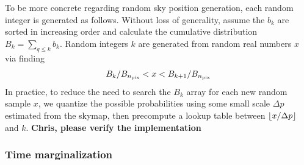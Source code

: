 To be more concrete regarding random sky position generation, each random integer is generated as follows. 
%
Without loss of generality, assume the $b_k$ are sorted in increasing order and calculate the cumulative distribution $B_k
= \sum_{q\le k} b_k$.   Random integers $k$ are generated from random real numbers $x$ via finding
\begin{eqnarray}
 B_k/B_{n_{\rm pix}} < x <  B_{k+1}/B_{n_{\rm pix}}
\end{eqnarray}
In practice, to reduce the need to search the $B_k$ array for each new random sample $x$, we quantize the possible probabilities
using some small scale $\Delta p$ estimated from the skymap, then  precompute a lookup table between $\floor*{x/\Delta
  p}$ and $k$.    \textbf{Chris, please verify the implementation}





\subsubsection{Time marginalization}

